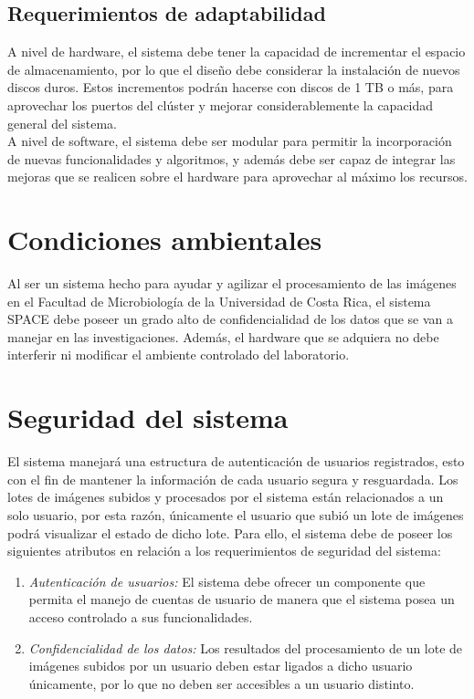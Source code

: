 \documentclass{scrreprt}
\begin{document}
\subsection{Requerimientos de adaptabilidad}

A nivel de hardware, el sistema debe tener la capacidad de incrementar el espacio de almacenamiento, por lo que el diseño debe considerar la instalación de nuevos discos duros. Estos incrementos podrán hacerse con discos de 1 TB o más, para aprovechar los puertos del clúster y mejorar considerablemente la capacidad general del sistema.\\

A nivel de software, el sistema debe ser modular para permitir la incorporación de nuevas funcionalidades y algoritmos, y además debe ser capaz de integrar las mejoras que se realicen sobre el hardware para aprovechar al máximo los recursos.\\


\section{Condiciones ambientales}

Al ser un sistema hecho para ayudar y agilizar el procesamiento de las imágenes en el Facultad de Microbiología de la Universidad de Costa Rica, el sistema SPACE debe poseer un grado alto de confidencialidad de los datos que se van a manejar en las investigaciones. Además, el hardware que se adquiera no debe interferir ni modificar el ambiente controlado del laboratorio.

\section{Seguridad del sistema}

El sistema manejará una estructura de autenticación de usuarios registrados, esto con el fin de mantener la información de cada usuario segura y resguardada. Los lotes de imágenes subidos y procesados por el sistema están relacionados a un solo usuario, por esta razón, únicamente el usuario que subió un lote de imágenes podrá visualizar el estado de dicho lote. Para ello, el sistema debe de poseer los siguientes atributos en relación a los requerimientos de seguridad del sistema:

\begin{enumerate}[label=\alph*.]
	\item \textit{Autenticación de usuarios:} El sistema debe ofrecer un componente que permita el manejo de cuentas de usuario de manera que el sistema posea un acceso controlado a sus funcionalidades.
    \item \textit{Confidencialidad  de los datos:} Los resultados del procesamiento de un lote de imágenes subidos por un usuario deben estar ligados a dicho usuario únicamente, por lo que no deben ser accesibles a un usuario distinto.
\end{enumerate}
\end{document}
